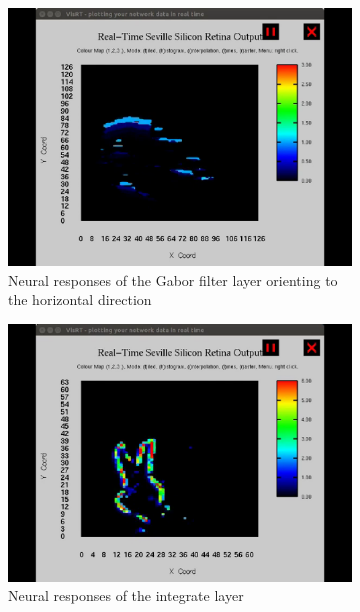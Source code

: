 \documentclass[journal]{journal}
\begin{document}
\begin{figure}
\centering
	\begin{subfigure}[t]{0.24\textwidth}
		\includegraphics[width=\textwidth]{pics/live1.png}
	    \caption{Neural responses of the Gabor filter layer orienting to the horizontal direction }
	    \label{fig:live1}
	\end{subfigure}
	\begin{subfigure}[t]{0.24\textwidth}
		\includegraphics[width=\textwidth]{pics/live2.png}
		\caption{Neural responses of the integrate layer}
	    \label{fig:live2}
	\end{subfigure}
	\\
	\begin{subfigure}[t]{0.42\textwidth}

\end{subfigure}
\end{figure}
\end{document}
